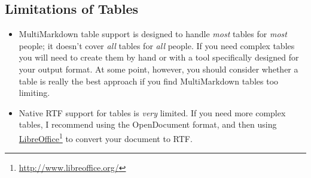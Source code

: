 \subsection{Limitations of Tables}
\label{limitationsoftables}

\begin{itemize}
\item MultiMarkdown table support is designed to handle \emph{most} tables for \emph{most} people; it doesn't cover \emph{all} tables for \emph{all} people. If you need complex tables you will need to create them by hand or with a tool specifically designed for your output format. At some point, however, you should consider whether a table is really the best approach if you find MultiMarkdown tables too limiting.

\item Native RTF support for tables is \emph{very} limited. If you need more complex tables, I recommend using the OpenDocument format, and then using \href{http://www.libreoffice.org/}{LibreOffice}\footnote{\href{http://www.libreoffice.org/}{http:\slash{}\slash{}www.libreoffice.org\slash{}}} to convert your document to RTF.

\end{itemize}



